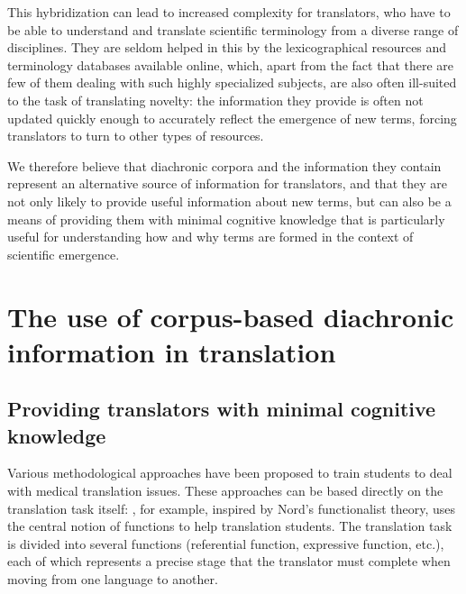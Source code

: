 \documentclass[output=paper]{langscibook}
\begin{document}
\largerpage
This hybridization can lead to increased complexity for translators, who have to be able to understand and translate scientific terminology from a diverse range of disciplines. They are seldom helped in this by the lexicographical resources and terminology databases available online, which, apart from the fact that there are few of them dealing with such highly specialized subjects, are also often ill-suited to the task of translating novelty: the information they provide is often not updated quickly enough to accurately reflect the emergence of new terms, forcing translators to turn to other types of resources.

We therefore believe that diachronic corpora and the information they contain represent an alternative source of information for translators, and that they are not only likely to provide useful information about new terms, but can also be a means of providing them with minimal cognitive knowledge that is particularly useful for understanding how and why terms are formed in the context of scientific emergence.

\section{The use of corpus-based diachronic information in translation}

\subsection{Providing translators with minimal cognitive knowledge}\label{sec:cuchet:2.1}

Various methodological approaches have been proposed to train students to deal with medical translation issues. These approaches can be based directly on the translation task itself: \citet{Popineau2016}, for example, inspired by Nord’s functionalist theory, uses the central notion of functions to help translation students. The translation task is divided into several functions (referential function, expressive function, etc.), each of which represents a precise stage that the translator must complete when moving from one language to another.
\end{document}
